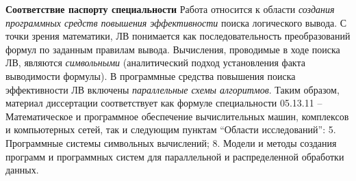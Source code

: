 \documentclass[a4paper]{report}
\begin{document}




\textbf{Соответствие паспорту специальности}
Работа относится к области \emph{создания программных средств повышения эффективности} поиска логического вывода. С точки зрения математики, ЛВ понимается как последовательность преобразований формул по заданным правилам вывода. Вычисления, проводимые в ходе поиска ЛВ, являются \emph{символьными} (аналитический подход установления факта выводимости формулы). В программные средства повышения поиска эффективности ЛВ включены \emph{параллельные схемы алгоритмов}. Таким образом, материал диссертации соответствует как формуле специальности 05.13.11 -- Математическое и программное обеспечение вычислительных машин, комплексов и компьютерных сетей, так и следующим пунктам ``Области исследований'': 5. Программные системы символьных вычислений; 8. Модели и методы создания программ и программных систем для параллельной и распределенной обработки данных.
\end{document}
